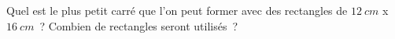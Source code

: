%
%
Quel est le plus petit carré que l'on peut former avec des rectangles de $12\ cm$ x $16\ cm$~? Combien de rectangles seront utilisés~?
